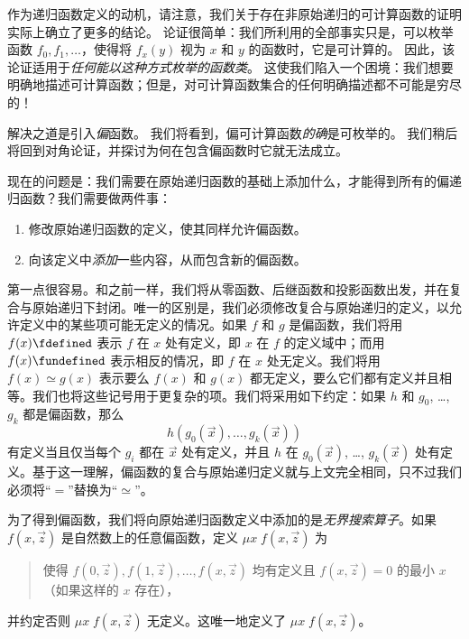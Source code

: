 \documentclass[../../../include/open-logic-section]{subfiles}
\begin{document}

作为递归函数定义的动机，请注意，我们关于存在非原始递归的可计算函数的证明实际上确立了更多的结论。
论证很简单：我们所利用的全部事实只是，可以枚举函数 $f_0,f_1,\dots$，使得将 $f_x(y)$ 视为 $x$ 和 $y$ 的函数时，它是可计算的。
因此，该论证适用于\emph{任何能以这种方式枚举的函数类}。
这使我们陷入一个困境：我们想要明确地描述可计算函数；但是，对可计算函数集合的任何明确描述都不可能是穷尽的！

解决之道是引入\emph{偏}函数。
我们将看到，偏可计算函数\emph{的确}是可枚举的。
我们稍后将回到对角论证，并探讨为何在包含偏函数时它就无法成立。

现在的问题是：我们需要在原始递归函数的基础上添加什么，才能得到所有的偏递归函数？我们需要做两件事：

\begin{enumerate}
\item 修改原始递归函数的定义，使其同样允许偏函数。
\item 向该定义中\emph{添加}一些内容，从而包含新的偏函数。
\end{enumerate}

第一点很容易。和之前一样，我们将从零函数、后继函数和投影函数出发，并在复合与原始递归下封闭。唯一的区别是，我们必须修改复合与原始递归的定义，以允许定义中的某些项可能无定义的情况。如果 $f$ 和 $g$ 是偏函数，我们将用 $f(x) \fdefined$ 表示 $f$ 在 $x$ 处有定义，即 $x$ 在 $f$ 的定义域中；而用 $f(x) \fundefined$ 表示相反的情况，即 $f$ 在 $x$ 处无定义。我们将用 $f(x) \simeq g(x)$ 表示要么 $f(x)$ 和 $g(x)$ 都无定义，要么它们都有定义并且相等。我们也将这些记号用于更复杂的项。我们将采用如下约定：如果 $h$ 和 $g_0$, \dots, $g_k$ 都是偏函数，那么
\[
h(g_0(\vec x),\dots,g_k(\vec x))
\]
有定义当且仅当每个 $g_i$ 都在 $\vec x$ 处有定义，并且 $h$ 在 $g_0(\vec x)$, \dots, $g_k(\vec x)$ 处有定义。基于这一理解，偏函数的复合与原始递归定义就与上文完全相同，只不过我们必须将“$=$”替换为“$\simeq$”。

为了得到偏函数，我们将向原始递归函数定义中添加的是\emph{无界搜索算子}。如果 $f(x,\vec z)$ 是自然数上的任意偏函数，定义 $\mu x \; f(x,\vec z)$ 为

\begin{quote}
  使得 $f(0,\vec z), f(1,\vec z), \dots, f(x,\vec
  z)$ 均有定义且 $f(x,\vec z) = 0$ 的最小 $x$（如果这样的 $x$ 存在），
\end{quote}

并约定否则 $\mu x \; f(x,\vec z)$ 无定义。这唯一地定义了 $\mu x \; f(x,\vec z)$。
\end{document}
